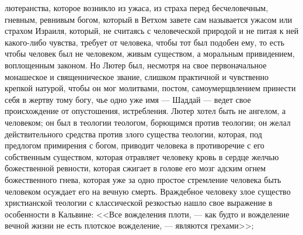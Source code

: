 \documentclass[12pt]{article}
\begin{document}
лютеранства, которое возникло из ужаса, из страха перед бесчеловечным, гневным, ревнивым богом, который в Ветхом завете сам называется ужасом или страхом Израиля, который, не считаясь с человеческой природой и не питая к ней какого-либо чувства, требует от человека, чтобы тот был подобен ему, то есть чтобы человек был не человеком, живым существом, а моральным привидением, воплощенным законом. Но Лютер был, несмотря на свое первоначальное монашеское и священническое звание, слишком практичной и чувственно крепкой натурой, чтобы он мог молитвами, постом, самоумерщвлением принести себя в жертву тому богу, чье одно уже имя --- Шаддай --- ведет свое происхождение от опустошения, истребления. Лютер хотел быть не ангелом, а человеком; он был в теологии теологом, борющимся против теологии; он желал действительного средства против злого существа теологии, которая, под предлогом примирения с богом, приводит человека в противоречие с его собственным существом, которая отравляет человеку кровь в сердце желчью божественной ревности, которая сжигает в голове его мозг адским огнем божественного гнева, которая уже за одно простое стремление человека быть человеком осуждает его на вечную смерть. Враждебное человеку злое существо христианской теологии с классической резкостью нашло свое выражение в особенности в Кальвине: <<Все вожделения плоти, --- как будто и вожделение вечной жизни не есть плотское вожделение, --- являются грехами>>; 
\end{document}
